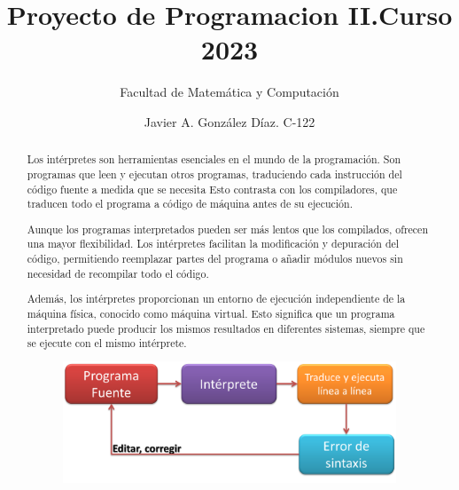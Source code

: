 \documentclass{article}%
\begin{document}
\title{Proyecto de Programacion II.Curso 2023}
\author{Facultad de Matemática y Computación}
\date{Javier A. González Díaz.     C-122}
\maketitle

\begin{abstract}

    Los intérpretes son herramientas esenciales en el mundo de la programación. Son programas que leen y ejecutan otros programas, 
    traduciendo cada instrucción del código fuente a medida que se necesita
    Esto contrasta con los compiladores, que traducen todo el programa a código de máquina antes de su ejecución.
    
    Aunque los programas interpretados pueden ser más lentos que los compilados, ofrecen una mayor flexibilidad. Los intérpretes 
    facilitan la modificación y depuración del código, permitiendo reemplazar partes del programa o añadir módulos nuevos 
    sin necesidad de recompilar todo el código.
    
    Además, los intérpretes proporcionan un entorno de ejecución independiente de la máquina física, conocido como máquina virtual. 
    Esto significa que un programa interpretado puede producir los mismos resultados en diferentes sistemas, 
    siempre que se ejecute con el mismo intérprete.
    
    
\begin{figure}[h]
    \begin{center}
        \includegraphics*[width=10cm]{Interprete.png}
        
    \end{center}   
\end{figure}

\end{abstract}
\end{document}
